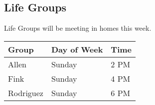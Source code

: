 \subsection{Life Groups}
\label{life_groups}

Life Groups will be meeting in homes this week. 

\begin{tabular}{@{}lll}
Group & Day of Week & Time \\ 
\hline
Allen & Sunday & 2 PM \\
Fink & Sunday & 4 PM \\
Rodriguez & Sunday & 6 PM \\
\end{tabular}